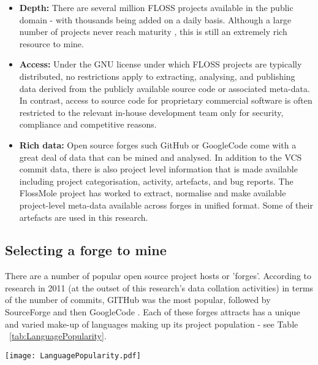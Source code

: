 \begin{itemize}
\item \textbf{Depth:} There are several million FLOSS projects available in the public domain - with thousands being added on a daily basis. Although a large number of projects never reach maturity \cite{comino2005planning}, this is still an extremely rich resource to mine\cite{deshpande2008total}.
\item \textbf{Access:} Under the GNU \cite{license2007version} license under which FLOSS projects are typically distributed, no restrictions apply to extracting, analysing, and publishing data derived from the publicly available source code or associated meta-data. In contrast, access to source code for proprietary commercial software is often restricted to the relevant in-house development team only for security, compliance and competitive reasons.
\item \textbf{Rich data:} Open source forges such GitHub \cite{github} or GoogleCode \cite{googlecode} come with a great deal of data that can be mined and analysed. In addition to the VCS commit data, there is also project level information that is made available including project categorisation, activity, artefacts, and bug reports. The FlossMole project \cite{howison2009flossmole} has worked to extract, normalise and make available project-level meta-data available across forges in unified format. Some of their artefacts are used in this research.
\end{itemize}

\subsection{Selecting a forge to mine}
There are a number of popular open source project hosts or 'forges'. According to research in 2011 (at the outset of this research's data collation activities) in terms of the number of commits, GITHub was the most popular, followed by SourceForge and then GoogleCode \cite{grady2011what}. Each of these forges attracts has a unique and varied make-up of languages making up its project population - see Table ~\ref{tab:LanguagePopularity}.

\begin{table}
\centering 
{}
\begin{tabular}
 \centering 
 \texttt{[image: LanguagePopularity.pdf]}
 \label{tab:LanguagePopularity}
\end{tabular}
\end{table}


